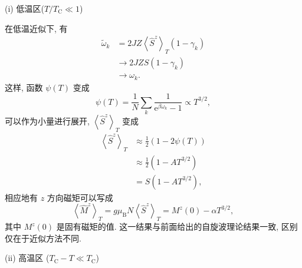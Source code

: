 (i) 低温区($T/T_{\mathrm{C}}\ll 1$)

在低温近似下, 有
 \begin{align}
        \tilde \omega_k&=2JZ\left\langle \hat{S}^z \right\rangle_T(1-\gamma_k)\nonumber\\
        &\to 2JZS(1-\gamma_k)\nonumber\\
&\to \omega_k.
    \end{align}
这样, 函数 $\psi(T)$ 变成
\begin{equation}
    \psi(T)=\frac{1}{N}\sum_{k}\frac{1}{\mathrm{e}^{\beta\omega_k}-1}\propto T^{3/2},
\end{equation}
可以作为小量进行展开, $\left\langle\hat{S}^z\right\rangle_T$ 变成
 \begin{align}
        \left\langle \hat{S}^z \right\rangle_T&\approx \frac{1}{2}\left( 1-2\psi(T) \right)\nonumber\\
        &\approx \frac{1}{2}\left( 1-A T^{3/2} \right)\nonumber\\
        &=S\left( 1-A T^{3/2} \right),
    \end{align}
相应地有 $z$ 方向磁矩可以写成
\begin{equation}
    \left\langle \hat{M}^z \right\rangle_T=g\mu_{\mathrm{B}}N\left\langle \hat{S}^z \right\rangle_T =M^z(0)-\alpha T^{3/2},
\end{equation}
其中 $M^z(0)$ 是固有磁矩的值. 这一结果与前面给出的自旋波理论结果一致, 区别仅在于近似方法不同.

(ii) 高温区 ($T_{\mathrm{C}}-T\ll T_{\mathrm{C}}$)

